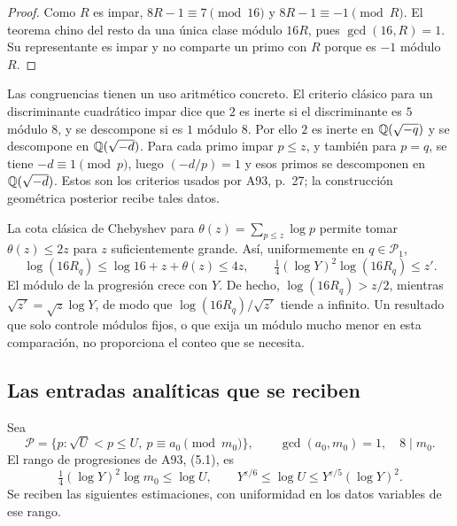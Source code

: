\begin{proof}
Como $R$ es impar, $8R-1\equiv7\pmod{16}$ y
$8R-1\equiv-1\pmod R$. El teorema chino del resto da una única
clase módulo $16R$, pues $\gcd(16,R)=1$. Su representante es impar
y no comparte un primo con $R$ porque es $-1$ módulo $R$.
\end{proof}

Las congruencias tienen un uso aritmético concreto. El criterio clásico
para un discriminante cuadrático impar dice que $2$ es inerte si el
discriminante es $5$ módulo $8$, y se descompone si es $1$ módulo $8$.
Por ello $2$ es inerte en $\mathbb{Q}(\sqrt{-q})$ y se descompone en
$\mathbb{Q}(\sqrt{-d})$. Para cada primo impar $p\le z$, y también para
$p=q$, se tiene $-d\equiv1\pmod p$, luego $(-d/p)=1$ y esos primos
se descomponen en $\mathbb{Q}(\sqrt{-d})$. Estos son los criterios usados
por A93, p.~27; la construcción geométrica posterior recibe tales datos.

La cota clásica de Chebyshev para
$\theta(z)=\sum_{p\le z}\log p$ permite tomar $\theta(z)\le2z$
para $z$ suficientemente grande. Así, uniformemente en $q\in\mathcal P_1$,
\begin{equation}
 \log(16R_q)\le\log16+z+\theta(z)\le4z,
 \qquad \tfrac14(\log Y)^2\log(16R_q)\le z'.
 \label{eq:aux-modulo}
\end{equation}
El módulo de la progresión crece con $Y$. De hecho,
$\log(16R_q)>z/2$, mientras $\sqrt{z'}=\sqrt z\log Y$, de modo
que $\log(16R_q)/\sqrt{z'}$ tiende a infinito. Un resultado que
solo controle módulos fijos, o que exija un módulo mucho menor en
esta comparación, no proporciona el conteo que se necesita.

\subsection{Las entradas analíticas que se reciben}
\label{subsec:aux-entradas}

Sea
\[
 \mathcal P=\{p:\sqrt U<p\le U,\ p\equiv a_0\pmod{m_0}\},
 \qquad \gcd(a_0,m_0)=1,\quad8\mid m_0.
\]
El rango de progresiones de A93, (5.1), es
\begin{equation}
 \tfrac14(\log Y)^2\log m_0\le\log U,
 \qquad Y^{\varepsilon/6}\le\log U
                  \le Y^{\varepsilon/5}(\log Y)^2.
 \label{eq:aux-rango}
\end{equation}
Se reciben las siguientes estimaciones, con uniformidad en los datos
variables de ese rango.

